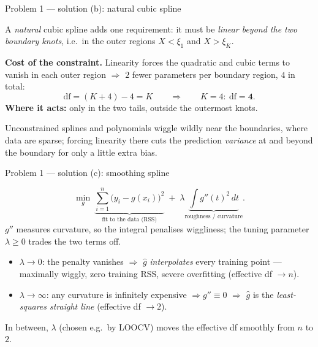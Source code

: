 \documentclass[aspectratio=169,11pt]{beamer}
\begin{document}
\begin{frame}{Problem 1 --- solution (b): natural cubic spline}
  \begin{solutionbox}
    A \emph{natural} cubic spline adds one requirement: it must be \emph{linear beyond the two
    boundary knots}, i.e.\ in the outer regions $X<\xi_1$ and $X>\xi_K$.
    \medskip

    \textbf{Cost of the constraint.} Linearity forces the quadratic and cubic terms to vanish in
    each outer region $\Rightarrow$ $2$ fewer parameters per boundary region, $4$ in total:
    \[
      \mathrm{df}=(K+4)-4=K
      \qquad\Longrightarrow\qquad K=4:\ \mathrm{df}=\mathbf{4}.
    \]
    \textbf{Where it acts:} only in the two tails, outside the outermost knots.
  \end{solutionbox}
  \begin{takeaway}
    \footnotesize Unconstrained splines and polynomials wiggle wildly near the boundaries, where
    data are sparse; forcing linearity there cuts the prediction \emph{variance} at and beyond the
    boundary for only a little extra bias.
  \end{takeaway}
\end{frame}

\begin{frame}{Problem 1 --- solution (c): smoothing spline}
  \begin{solutionbox}
    \[
      \min_{g}\ \underbrace{\sum_{i=1}^n\bigl(y_i-g(x_i)\bigr)^2}_{\text{fit to the data (RSS)}}
      \;+\;\lambda\underbrace{\int g''(t)^2\,dt}_{\text{roughness / curvature}} .
    \]
    $g''$ measures curvature, so the integral penalises wiggliness; the tuning parameter
    $\lambda\ge0$ trades the two terms off.
    \begin{itemize}
      \item $\lambda\to 0$: the penalty vanishes $\Rightarrow$ $\hat g$ \emph{interpolates} every
        training point --- maximally wiggly, zero training RSS, severe overfitting
        (effective df $\to n$).
      \item $\lambda\to\infty$: any curvature is infinitely expensive $\Rightarrow g''\equiv0$
        $\Rightarrow$ $\hat g$ is the \emph{least-squares straight line} (effective df $\to2$).
    \end{itemize}
    In between, $\lambda$ (chosen e.g.\ by LOOCV) moves the effective df smoothly from $n$ to $2$.
  \end{solutionbox}
\end{frame}
\end{document}
